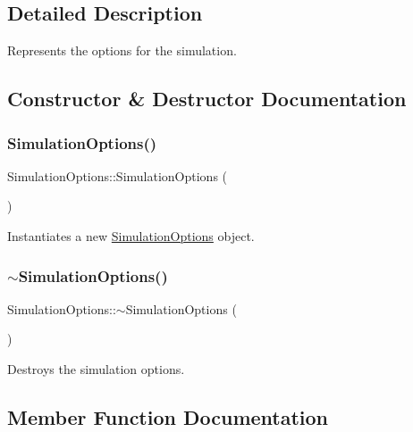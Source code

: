 \subsection{Detailed Description}
Represents the options for the simulation. 



\subsection{Constructor \& Destructor Documentation}
\mbox{\label{class_simulation_options_a05056945c8434dcdfc5ab9d28a82f0f8}} 
\subsubsection{\texorpdfstring{SimulationOptions()}{SimulationOptions()}}
{\footnotesize\ttfamily Simulation\+Options\+::\+Simulation\+Options (\begin{DoxyParamCaption}{ }\end{DoxyParamCaption})}



Instantiates a new \mbox{\hyperlink{class_simulation_options}{Simulation\+Options}} object. 

\mbox{\label{class_simulation_options_a1b2b2c848788b91de4925da6a6a023ee}} 
\subsubsection{\texorpdfstring{$\sim$SimulationOptions()}{~SimulationOptions()}}
{\footnotesize\ttfamily Simulation\+Options\+::$\sim$\+Simulation\+Options (\begin{DoxyParamCaption}{ }\end{DoxyParamCaption})\hspace{0.3cm}{\ttfamily [inline]}}



Destroys the simulation options. 



\subsection{Member Function Documentation}
\mbox{\label{class_simulation_options_a233c90f94e5a966bc4e06fda8449a8d8}} 

